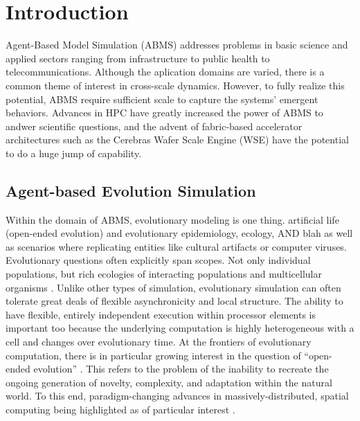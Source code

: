 \section{Introduction} \label{sec:introduction}

Agent-Based Model Simulation (ABMS) addresses problems in basic science and applied sectors ranging from infrastructure to public health to
telecommunications.
Although the aplication domains are varied, there is a common theme of interest in cross-scale dynamics.
However, to fully realize this potential, ABMS require sufficient scale to capture the systems' emergent behaviors.
Advances in HPC have greatly increased the power of ABMS to andwer scientific questions, and the advent of fabric-based accelerator architectures such as the Cerebras Wafer Scale Engine (WSE) have the potential to do a huge jump of capability.

\subsection{Agent-based Evolution Simulation}

Within the domain of ABMS, evolutionary modeling is one thing.
artificial life (open-ended evolution) and evolutionary epidemiology, ecology, AND blah as well as scenarios where replicating entities like cultural artifacts or computer viruses.
Evolutionary questions often explicitly span scopes.
Not only individual populations, but rich ecologies of interacting populations and multicellular organisms \citep{morenoDISHTINYTODO}.
Unlike other types of simulation, evolutionary simulation can often tolerate great deals of flexible asynchronicity and local structure.
The ability to have flexible, entirely independent execution within processor elements is important too because the underlying computation is highly heterogeneous with a cell and changes over evolutionary time.
At the frontiers of evolutionary computation, there is in particular growing interest in the question of ``open-ended evolution'' \citep{alifeworkshopsTODO}.
This refers to the problem of the inability to recreate the ongoing generation of novelty, complexity, and adaptation within the natural world.
To this end, paradigm-changing advances in massively-distributed, spatial computing being highlighted as of particular interest \citep{ackleyTODO}.

